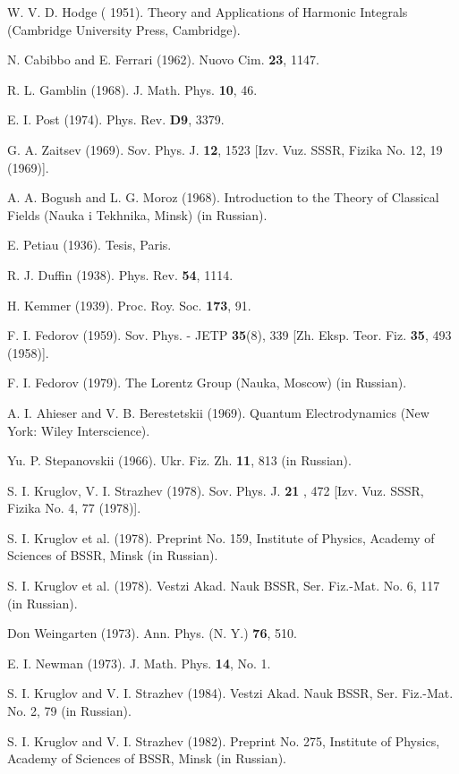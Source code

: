 \documentclass[a4paper,12pt]{article}
\begin{document}
\begin{thebibliography}{99}
  W. V. D. Hodge ( 1951). Theory and Applications of Harmonic
Integrals (Cambridge University Press, Cambridge).

  N. Cabibbo and E. Ferrari (1962). Nuovo Cim. \textbf{23}, 1147.

  R. L. Gamblin (1968). J. Math. Phys. \textbf{10}, 46.

  E. I. Post (1974). Phys. Rev. \textbf{D9}, 3379.

  G. A. Zaitsev (1969). Sov. Phys. J. \textbf{12}, 1523 [Izv.
Vuz. SSSR, Fizika No. 12, 19 (1969)].

  A. A. Bogush and L. G. Moroz (1968). Introduction to the
Theory of Classical Fields (Nauka i Tekhnika, Minsk) (in Russian).

  E. Petiau (1936). Tesis, Paris.

  R. J. Duffin (1938). Phys. Rev. \textbf{54}, 1114.

  H. Kemmer (1939). Proc. Roy. Soc. \textbf{173}, 91.

  F. I. Fedorov (1959). Sov. Phys. - JETP \textbf{35}(8), 339
[Zh. Eksp. Teor. Fiz. \textbf{35}, 493 (1958)].

  F. I. Fedorov (1979). The Lorentz Group (Nauka, Moscow) (in
Russian).

  A. I. Ahieser and V. B. Berestetskii (1969). Quantum
Electrodynamics (New York: Wiley Interscience).

  Yu. P. Stepanovskii (1966). Ukr. Fiz. Zh. \textbf{11}, 813 (in
Russian).

  S. I. Kruglov, V. I. Strazhev (1978). Sov. Phys. J. \textbf{21}
, 472 [Izv. Vuz. SSSR, Fizika No. 4, 77 (1978)].

  S. I. Kruglov et al. (1978). Preprint No. 159, Institute of
Physics, Academy of Sciences of BSSR, Minsk (in Russian).

  S. I. Kruglov et al. (1978). Vestzi Akad. Nauk BSSR, Ser.
Fiz.-Mat. No. 6, 117 (in Russian).

  Don Weingarten (1973). Ann. Phys. (N. Y.) \textbf{76}, 510.

  E. I. Newman (1973). J. Math. Phys. \textbf{14}, No. 1.

  S. I. Kruglov and V. I. Strazhev (1984). Vestzi Akad. Nauk
BSSR, Ser. Fiz.-Mat. No. 2, 79 (in Russian).

  S. I. Kruglov and V. I. Strazhev (1982). Preprint No. 275,
Institute of Physics, Academy of Sciences of BSSR, Minsk (in Russian).


\end{thebibliography}
\end{document}

